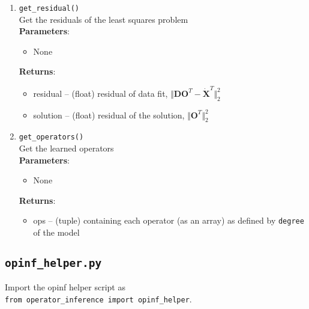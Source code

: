 \documentclass[11pt]{article} %
\newcommand{\code}[1]{\colorbox{light-gray}{\texttt{#1}}}
\begin{document}
\begin{enumerate}
\item{\code{get\_residual()}}\\
Get the residuals of the least squares problem\\
\textbf{Parameters}:
	\begin{itemize}
		\item[] None
	\end{itemize}
\textbf{Returns}:
\begin{itemize}
\item[] residual -- (float) residual of data fit, $\Vert \mathbf{D}\mathbf{O}^T -\dot{ \mathbf{X}}^T \Vert_2^2$
\item[] solution -- (float) residual of the solution, $\Vert \mathbf{O}^T \Vert_2^2$
\end{itemize}

\item{ \code{get\_operators()}}\\
Get the learned operators\\
\textbf{Parameters}:
	\begin{itemize}
		\item[] None
	\end{itemize}
\textbf{Returns}:
\begin{itemize}
\item[] ops -- (tuple) containing each operator (as an array) as defined by \code{degree} of the model
\end{itemize}

\end{enumerate}
\newpage
\subsection{\code{opinf\_helper.py} }
Import the opinf helper script as\\
 \indent \code{from operator\_inference import opinf\_helper}. \\
\end{document}
